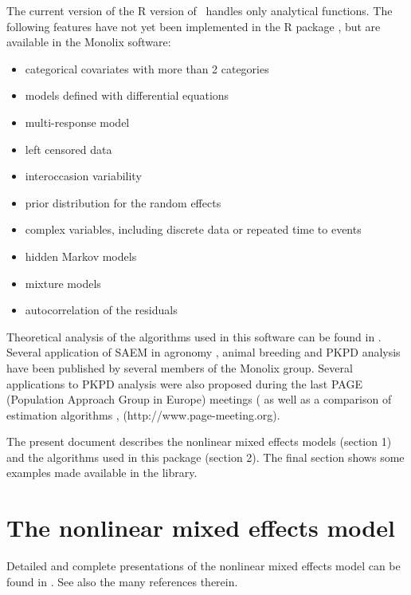 The current version of the R version of \monolix~handles only analytical functions. The following features have not yet been implemented in the R package \monolix, but are available in the {\sc Monolix} software:
\begin{itemize}
\item categorical covariates with more than 2 categories
\item models defined with differential equations
\item multi-response model
\item left censored data
\item interoccasion variability
\item prior distribution for the random effects
\item complex variables, including discrete data or repeated time to events
\item hidden Markov models
\item mixture models
\item autocorrelation of the residuals
\end{itemize}

Theoretical analysis of the algorithms used in this software can be found in \cite{Delyon, samson_jspi06, Kuhn01, Kuhn05}. Several application of SAEM in agronomy \cite{Makowski06}, animal breeding \cite{Jaffrezic06} and PKPD analysis \cite{Comets07, Lavielle07, samson_csda06, samson_sim06a, Bertrand09} have been published by several members of the {\sf Monolix} group. Several applications to PKPD analysis were also proposed during the last PAGE (Population Approach Group in Europe) meetings (\cite{page06b, page05a, page03, page04a, page06c, page05b} as well as a comparison of estimation algorithms \cite{page05c}, ({http://www.page-meeting.org}).

The present document describes the nonlinear mixed effects models (section 1) and the algorithms used in this package (section 2). The final section shows some examples made available in the library.

\section{The nonlinear mixed effects model}

Detailed and complete presentations of the nonlinear mixed effects model can be found in \cite{Davidian95, davgil1, PinheiroBates00}. See also the many references therein.

